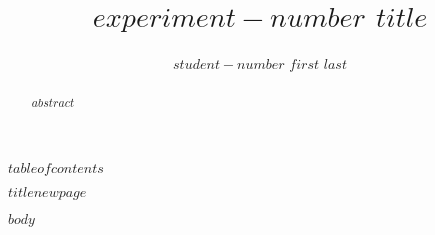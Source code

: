\documentclass[uplatex,dvipdfmx,a4paper,10pt]{jsarticle}
\title{$experiment-number$ $title$}
\author{$student-number$ $first$ $last$}
\begin{document}
\maketitle

\begin{abstract}$abstract$\end{abstract}
	
$tableofcontents$

\thispagestyle{empty}

$titlenewpage$

%
$body$

\printbibliography[title=参考文献]
\end{document}
